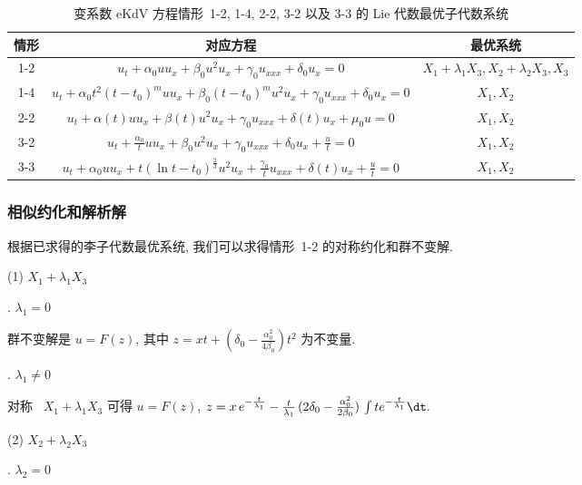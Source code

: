 \begin{table}\caption{变系数 eKdV 方程情形~1-2, 1-4, 2-2, 3-2 以及 3-3 的 Lie 代数最优子代数系统}\label{T03}
\begin{center}
\begin{tabular}{|c|c|c|}
  \hline
  情形  & 对应方程 & 最优系统 \\
  \hline
  1-2 & $u_t+\alpha_0uu_x+\beta_0 u^2u_x+\gamma_0u_{xxx}+\delta_0 u_x=0$ & $X_1+\lambda_1 X_3, X_2+\lambda_2 X_3, X_3$ \\
  \hline
  1-4 & $u_t+\alpha_0t^2(t-t_0)^muu_x+\beta_0(t-t_0)^m u^2u_x+\gamma_0u_{xxx}+\delta_0 u_x=0$ & $X_1, X_2$ \\
  \hline
  2-2 & $u_t+\alpha(t)uu_x+\beta(t) u^2u_x+\gamma_0u_{xxx}+\delta(t) u_x+\mu_0 u=0$ & $X_1, X_2$ \\
  \hline
  3-2 & $u_t+\frac{\alpha_0}{t}uu_x+\beta_0 u^2u_x+\gamma_0u_{xxx}+\delta_0 u_x+\frac{u}{t}=0$ & $X_1, X_2$ \\
  \hline
  3-3 & $u_t+\alpha_0uu_x+t(\ln t-t_0)^{\frac{2}{3}} u^2u_x+\frac{\gamma_0}{t}u_{xxx}+\delta(t) u_x+\frac{u}{t}=0$ & $X_1, X_2$ \\
  \hline
\end{tabular}
\end{center}
\end{table}

\subsubsection{相似约化和解析解}
根据已求得的李子代数最优系统, 我们可以求得情形~1-2 的对称约化和群不变解.

\noindent(1) $X_1+\lambda_1 X_3$

\lowercase\expandafter{}. $\lambda_1=0$

群不变解是 $u=F(z)$, 其中 $z=xt+(\delta_0-\frac{\alpha_0^2}{4\beta_0})t^2$ 为不变量.

\lowercase\expandafter{}. $\lambda_1\neq0$

对称~ $X_1+\lambda_1 X_3$ 可得 $u=F(z)$, $z=x\,e^{-\frac{t}{\lambda_1}}-\frac{t}{\lambda_1}\,(2\delta_0-\frac{\alpha_0^2}{2\beta_0})\,\int te^{-\frac{t}{\lambda_1}}\dt.$

\noindent(2) $X_2+\lambda_2 X_3$

\lowercase\expandafter{}. $\lambda_2=0$

